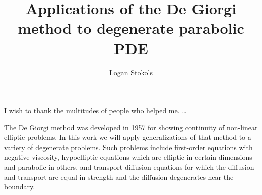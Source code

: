 \documentclass[12pt]{report}	%
\author{Logan Stokols}  	%
\title{Applications of the De Giorgi method to degenerate parabolic PDE}
\theoremstyle{definition}
\theoremstyle{remark}
\begin{document}
\copyrightpage          %


%
%
%
\commcertpage           %

\titlepage              %



%


\begin{acknowledgments}		%
%
I wish to thank the multitudes of people who helped me.  \ldots
\end{acknowledgments}


%
\utabstract
\indent
The De Giorgi method was developed in 1957 for showing continuity of non-linear elliptic problems.  In this work we will apply generalizations of that method to a variety of degenerate problems.  Such problems include first-order equations with negative viscosity, hypoelliptic equations which are elliptic in certain dimensions and parabolic in others, and transport-diffusion equations for which the diffusion and transport are equal in strength and the diffusion degenerates near the boundary.  



\tableofcontents   %

\listoftables      %
\listoffigures     %
\end{document}
